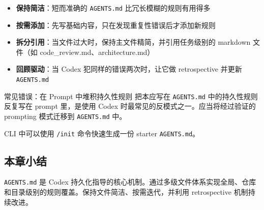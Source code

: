 \begin{itemize}
    \item \textbf{保持简洁}：短而准确的 \texttt{AGENTS.md} 比冗长模糊的规则有用得多
    \item \textbf{按需添加}：先写基础内容，只在发现重复性错误后才添加新规则
    \item \textbf{拆分引用}：当文件过大时，保持主文件精简，并引用任务级别的 markdown 文件（如 code\_review.md、architecture.md）
    \item \textbf{回顾驱动}：当 Codex 犯同样的错误两次时，让它做 retrospective 并更新 \texttt{AGENTS.md}
\end{itemize}

\begin{warningbox}{常见错误：在 Prompt 中堆积持久性规则}
把本应写在 \texttt{AGENTS.md} 中的持久性规则反复写在 prompt 里，是使用 Codex 时最常见的反模式之一。应当将经过验证的 prompting 模式迁移到 \texttt{AGENTS.md} 中。
\end{warningbox}

CLI 中可以使用 \texttt{/init} 命令快速生成一份 starter \texttt{AGENTS.md}。

\subsection{本章小结}

\texttt{AGENTS.md} 是 Codex 持久化指导的核心机制。通过多级文件体系实现全局、仓库和目录级别的规则覆盖。保持文件简洁、按需迭代，并利用 retrospective 机制持续改进。


